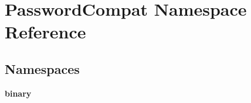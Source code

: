 \section{Password\+Compat Namespace Reference}
\label{namespace_password_compat}
\subsection*{Namespaces}
\begin{DoxyCompactItemize}
\item 
 {\bf binary}
\end{DoxyCompactItemize}
